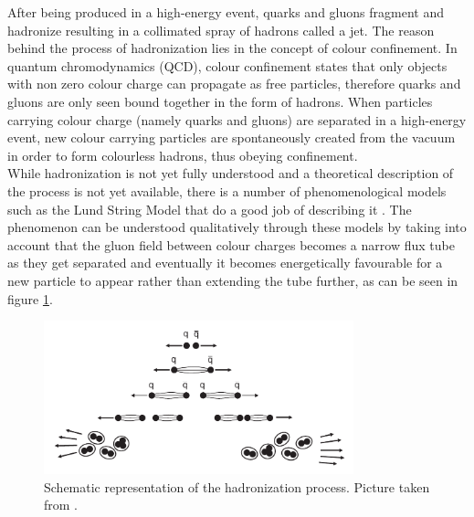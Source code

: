 \documentclass[main]{subfiles} %
\begin{document}


\doublespacing


\vspace{20pt}
After being produced in a high-energy event, quarks and gluons fragment and hadronize resulting in a collimated spray of hadrons called a jet. The reason behind the process of hadronization lies in the concept of colour confinement. In quantum chromodynamics (QCD), colour confinement states that only objects with non zero colour charge can propagate as free particles, therefore quarks and gluons are only seen bound together in the form of hadrons. When particles carrying colour charge (namely quarks and gluons) are separated in a high-energy event, new colour carrying particles are spontaneously created from the vacuum in order to form colourless hadrons, thus obeying confinement. \\

While hadronization is not yet fully understood and a theoretical description of the process is not yet available, there is a number of phenomenological models such as the Lund String Model that do a good job of describing it \cite{Andersson1983}. The phenomenon can be understood qualitatively through these models by taking into account that the gluon field between colour charges becomes a narrow flux tube as they get separated and eventually it becomes energetically favourable for a new particle to appear rather than extending the tube further, as can be seen in figure \ref{fig:hadronization}.\\

\begin{figure}[h]
    \centering
    \includegraphics[width=0.8\textwidth]{../Figures/Theory/hadronization.png}
    \caption{Schematic representation of the hadronization process. Picture taken from \cite{Thomson2013}.}
    \label{fig:hadronization}
\end{figure}
\end{document}
